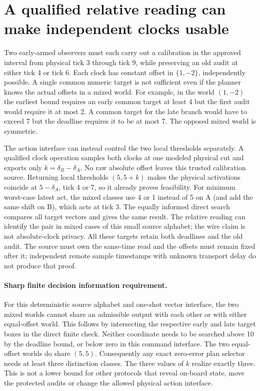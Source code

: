 \documentclass{article}
\begin{document}
\section*{A qualified relative reading can make independent clocks usable}
Two early-armed observers must each carry out a calibration in
the approved interval from physical tick 3 through tick 9, while
preserving an old audit at either tick 4 or tick 6. Each clock
has constant offset in \(\{1,-2\}\), independently possible.
A single common numeric target is not sufficient even if the
planner knows the actual offsets in a mixed world. For example,
in the world \((1,-2)\) the earliest bound requires an early
common target at least 4 but the first audit would require it
at most 2. A common target for the late branch would have to
exceed 7 but the deadline requires it to be at most 7. The
opposed mixed world is symmetric.

The action interface can instead control the two local thresholds
separately. A qualified clock operation samples both clocks
at one modeled physical cut and exports only
\(k=\delta_B-\delta_A\). No raw absolute offset leaves this
trusted calibration source. Returning local thresholds
\((5,5+k)\) makes the physical activations coincide at
\(5-\delta_A\), tick 4 or 7, so it already proves feasibility.
For minimum worst-case latest act, the mixed classes use 4
or 1 instead of 5 on A (and add the same shift on B), which
acts at tick 3. The equally informed direct search compares
all target vectors and gives the same result. The relative
reading can identify the pair in mixed cases of this small
source alphabet; the wire claim is not absolute-clock privacy.
All these targets retain both deadlines and the old audit. The source must own the
same-time read and the offsets must remain fixed after it;
independent remote sample timestamps with unknown transport
delay do not produce that proof.

\paragraph{Sharp finite decision information requirement.}
For this deterministic source alphabet and one-shot vector
interface, the two mixed worlds cannot share an admissible
output with each other or with either equal-offset world.
This follows by intersecting the respective early and late
target boxes in the direct finite check. Neither coordinate
needs to be searched above 10 by the deadline bound, or below
zero in this command interface. The two equal-offset worlds
do share \((5,5)\). Consequently any exact zero-error plan
selector needs at least three distinction classes. The
three values of \(k\) realize exactly three. This is not
a lower bound for other protocols that reveal on-board state,
move the protected audits or change the allowed physical action
interface.
\end{document}
